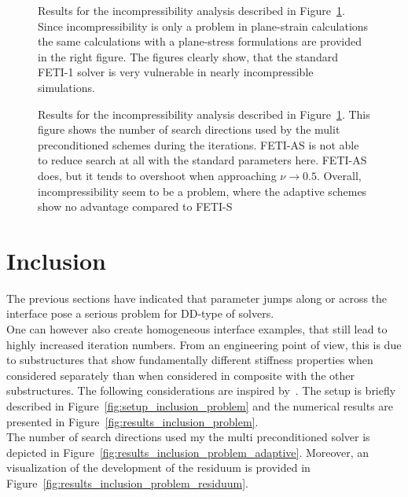 \begin{figure}[tb]
  \begin{center}
    
    \caption[Study of incompressibility handling: \# iterations]{Results for the incompressibility analysis described in Figure~\ref{fig:results_problem_incompressibility}. Since incompressibility is only a problem in plane-strain calculations the same calculations with a plane-stress formulations are provided in the right figure. The figures clearly show, that the standard FETI-1 solver is very vulnerable in nearly incompressible simulations.}
    \label{fig:results_problem_incompressibility}
  \end{center}
\end{figure}

\begin{figure}%
  \begin{center}
    
    \caption[Study of incompressibility handling: \# search directions]{Results for the incompressibility analysis described in Figure~\ref{fig:results_problem_incompressibility}. This figure shows the number of search directions used by the mulit preconditioned schemes during the iterations. FETI-AS is not able to reduce search at all with the standard parameters here. FETI-AS does, but it tends to overshoot when approaching $\nu\rightarrow 0.5$. Overall, incompressibility seem to be a problem, where the adaptive schemes show no advantage compared to FETI-S}
    \label{fig:todo}
  \end{center}
\end{figure}

\FloatBarrier
\section{Inclusion}
The previous sections have indicated that parameter jumps along or across the interface pose a serious problem for DD-type of solvers.\\
One can however also create homogeneous interface examples, that still lead to highly increased iteration numbers. From an engineering point of view, this is due to substructures that show fundamentally different stiffness properties when considered separately than when considered in composite with the other substructures. The following considerations are inspired by~\cite{Gosselet2015}. The setup is briefly described in Figure~\ref{fig:setup_inclusion_problem} and the numerical results are presented in Figure~\ref{fig:results_inclusion_problem}.\\
The number of search directions used my the multi preconditioned solver is depicted in Figure~\ref{fig:results_inclusion_problem_adaptive}. Moreover, an visualization of the development of the residuum is provided in Figure~\ref{fig:results_inclusion_problem_residuum}.

